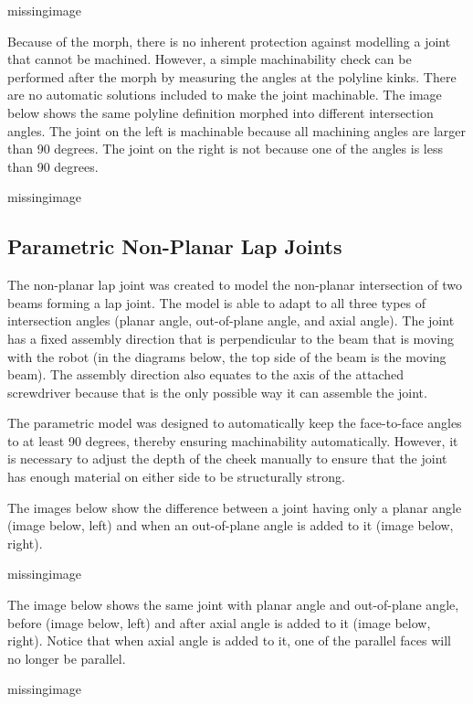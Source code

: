 missingimage

Because of the morph, there is no inherent protection against modelling a joint that cannot be machined. However, a simple machinability check can be performed after the morph by measuring the angles at the polyline kinks. There are no automatic solutions included to make the joint machinable. The image below shows the same polyline definition morphed into different intersection angles. The joint on the left is machinable because all machining angles are larger than 90 degrees. The joint on the right is not because one of the angles is less than 90 degrees. 

missingimage

\subsection{Parametric Non-Planar Lap Joints}
\label{subsection:exploration-4-parametric-non-planar-lap-joints}

The non-planar lap joint was created to model the non-planar intersection of two beams forming a lap joint. The model is able to adapt to all three types of intersection angles (planar angle, out-of-plane angle, and axial angle). The joint has a fixed assembly direction that is perpendicular to the beam that is moving with the robot (in the diagrams below, the top side of the beam is the moving beam). The assembly direction also equates to the axis of the attached screwdriver because that is the only possible way it can assemble the joint.

The parametric model was designed to automatically keep the face-to-face angles to at least 90 degrees, thereby ensuring machinability automatically. However, it is necessary to adjust the depth of the cheek manually to ensure that the joint has enough material on either side to be structurally strong.

The images below show the difference between a joint having only a planar angle (image below, left) and when an out-of-plane angle is added to it (image below, right).

missingimage

The image below shows the same joint with planar angle and out-of-plane angle, before (image below, left) and after axial angle is added to it (image below, right). Notice that when axial angle is added to it, one of the parallel faces will no longer be parallel. 

missingimage


